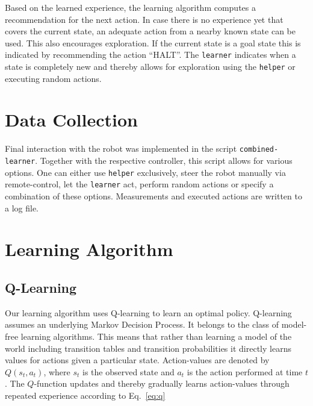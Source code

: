Based on the learned experience, the learning algorithm computes a recommendation for the next action. In case there is no experience yet that covers the current state, an adequate action from a nearby known state can be used. This also encourages exploration. If the current state is a goal state this is indicated by recommending the action ``HALT''. The \texttt{learner} indicates when a state is completely new and thereby allows for exploration using the \texttt{helper} or executing random actions.


\section{Data Collection}
Final interaction with the robot was implemented in the script \texttt{combined-learner}. Together with the respective controller, this script allows for various options. One can either use \texttt{helper} exclusively, steer the robot manually via remote-control, let the \texttt{learner} act, perform random actions or specify a combination of these options. Measurements and executed actions are written to a log file.



\section{Learning Algorithm}

\subsection{Q-Learning}

Our learning algorithm uses Q-learning to learn an optimal policy. Q-learning assumes an underlying Markov Decision Process. It belongs to the class of model-free learning algorithms. This means that rather than learning a model of the world including transition tables and transition probabilities it directly learns values for actions given a particular state. Action-values are denoted by $Q(s_t, a_t)$, where $s_t$ is the observed state and $a_t$ is the action performed at time $t$. The $Q$-function updates and thereby gradually learns action-values through repeated experience according to Eq.~\eqref{eq:q}

